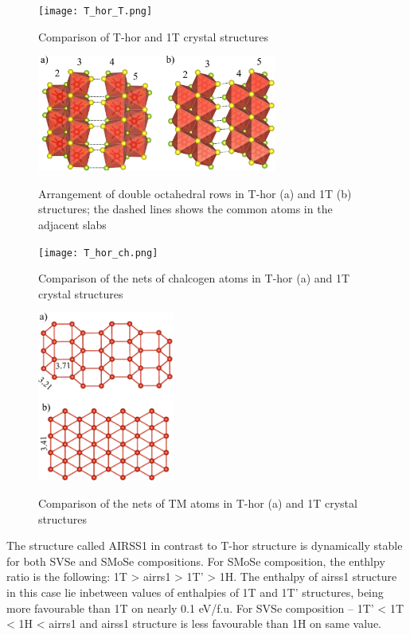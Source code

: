\documentclass[a4paperm]{article}
\begin{document}
\begin{figure}[H]
	\texttt{[image: T\_hor\_T.png]} \\
	\caption{Comparison of T-hor and 1T crystal structures}
	\label{T_hor_T}
\end{figure}

\begin{figure}[H]
	\includegraphics[width=0.7\textwidth]{T_hor_slabs.png} \\
	\caption{Arrangement of double octahedral rows in T-hor (a) and 1T (b) structures; the dashed lines shows the common atoms in the adjacent slabs}
	\label{T_hor_slabs}
\end{figure}

\begin{figure}[H]
	\texttt{[image: T\_hor\_ch.png]} \\
	\caption{Comparison of the nets of chalcogen atoms in T-hor (a) and 1T crystal structures }
	\label{T_hor_ch}
\end{figure}

\begin{figure}[H]
	\includegraphics[width=0.4\textwidth]{T_hor_V.png} \\
	\caption{Comparison of the nets of TM atoms in T-hor (a) and 1T crystal structures }
	\label{T_hor_V}
\end{figure}


The structure called AIRSS1 in contrast to T-hor structure is dynamically stable for both SVSe and SMoSe compositions.
For SMoSe composition, the enthlpy ratio is the following: 1T > airrs1 > 1T' > 1H.
The enthalpy of airss1 structure in this case lie inbetween values of enthalpies of 1T and 1T' structures, being more favourable than 1T on nearly 0.1 eV/f.u.
For SVSe composition -- 1T' < 1T < 1H < airrs1 and airss1 structure is less favourable than 1H on same value.
\end{document}
